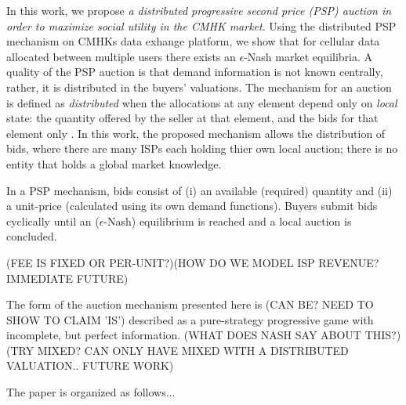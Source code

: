 \documentclass[12pt]{article}
\theoremstyle{definition}
\begin{document}
\begin{multicols}{2}
In this work, we propose \emph{a distributed progressive second price (PSP) auction in
order to maximize social utility in the CMHK market}. Using the
distributed PSP mechanism on CMHKs data
exhange platform, we show that for cellular data allocated between multiple users there
exists an $\epsilon$-Nash market equilibria. A quality of the PSP auction is that
demand information is not known centrally, rather, it is distributed in the
buyers' valuations. The mechanism for an auction is defined
as \emph{distributed} when the allocations at any element depend only on
\emph{local} state: the quantity offered by the seller at that element, and the
bids for that element only \cite{lazar}. In this work, the proposed mechanism
allows the distribution of bids, where there are many ISPs each holding
thier own local auction; there is no entity that holds a global market knowledge.

In a PSP mechanism, bids consist of (i) an available (required) quantity and (ii) a unit-price (calculated
using its own demand functions). Buyers submit bids cyclically until an
($\epsilon$-Nash) equilibrium is reached and a local auction is concluded. 

(FEE IS FIXED OR
PER-UNIT?)(HOW DO WE MODEL ISP REVENUE? IMMEDIATE FUTURE)

The form of the auction mechanism presented here is (CAN BE? NEED TO SHOW TO
CLAIM 'IS') described as a
pure-strategy progressive game with incomplete, but perfect information. (WHAT
DOES NASH SAY ABOUT THIS?) (TRY MIXED? CAN ONLY HAVE MIXED WITH A DISTRIBUTED
VALUATION.. FUTURE WORK) 

The paper is organized as follows...


\end{multicols}
\end{document}
